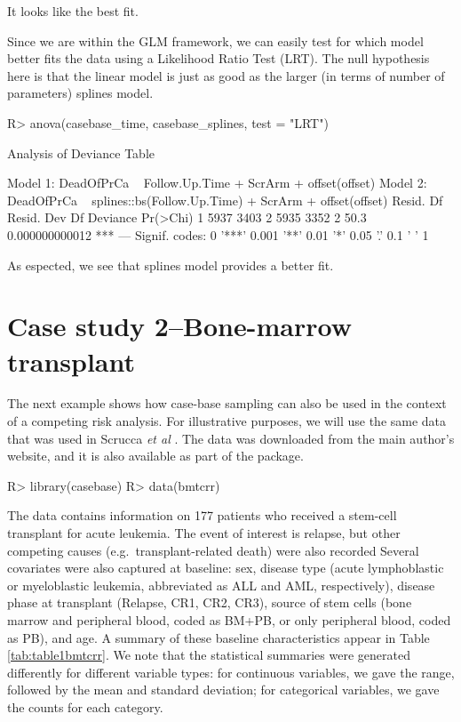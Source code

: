 \documentclass[article]{jss}
\begin{document}
It looks like the best fit.

Since we are within the GLM framework, we can easily test for which
model better fits the data using a Likelihood Ratio Test (LRT). The null
hypothesis here is that the linear model is just as good as the larger
(in terms of number of parameters) splines model.

\begin{CodeChunk}

\begin{CodeInput}
R> anova(casebase_time, casebase_splines, test = "LRT")
\end{CodeInput}

\begin{CodeOutput}
Analysis of Deviance Table

Model 1: DeadOfPrCa ~ Follow.Up.Time + ScrArm + offset(offset)
Model 2: DeadOfPrCa ~ splines::bs(Follow.Up.Time) + ScrArm + offset(offset)
  Resid. Df Resid. Dev Df Deviance       Pr(>Chi)    
1      5937       3403                               
2      5935       3352  2     50.3 0.000000000012 ***
---
Signif. codes:  0 '***' 0.001 '**' 0.01 '*' 0.05 '.' 0.1 ' ' 1
\end{CodeOutput}
\end{CodeChunk}

As espected, we see that splines model provides a better fit.

\section{Case study 2--Bone-marrow
transplant}\label{case-study-2bone-marrow-transplant}

The next example shows how case-base sampling can also be used in the
context of a competing risk analysis. For illustrative purposes, we will
use the same data that was used in Scrucca \emph{et al}
\citeyearpar{scrucca2010regression}. The data was downloaded from the
main author's website, and it is also available as part of the
 package.

\begin{CodeChunk}

\begin{CodeInput}
R> library(casebase)
R> data(bmtcrr)
\end{CodeInput}
\end{CodeChunk}

The data contains information on 177 patients who received a stem-cell
transplant for acute leukemia. The event of interest is relapse, but
other competing causes (e.g.~transplant-related death) were also
recorded Several covariates were also captured at baseline: sex, disease
type (acute lymphoblastic or myeloblastic leukemia, abbreviated as ALL
and AML, respectively), disease phase at transplant (Relapse, CR1, CR2,
CR3), source of stem cells (bone marrow and peripheral blood, coded as
BM+PB, or only peripheral blood, coded as PB), and age. A summary of
these baseline characteristics appear in Table \ref{tab:table1bmtcrr}.
We note that the statistical summaries were generated differently for
different variable types: for continuous variables, we gave the range,
followed by the mean and standard deviation; for categorical variables,
we gave the counts for each category.
\end{document}
